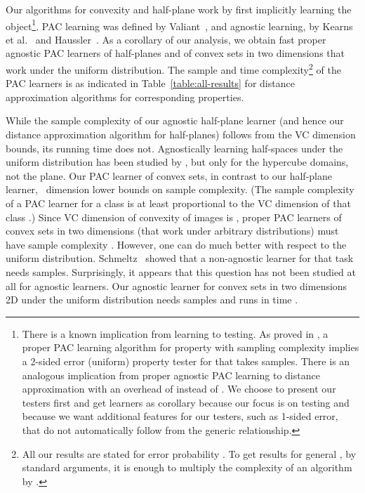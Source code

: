 \documentclass[11pt,english]{article}
\numberwithin{figure}{section}
\begin{document}
Our algorithms for convexity and half-plane work by first implicitly learning the object\footnote{\label{fn:connection-to-learning}There is a known implication from learning to testing. As proved in \cite{GGR98}, a proper PAC learning algorithm for property 
with sampling complexity  implies a 2-sided error (uniform) property tester for  that takes  samples. There is an analogous implication from proper agnostic PAC learning to distance approximation with an overhead of  instead of . We choose to present our testers first and get learners as corollary because our focus is on testing and because we want additional features for our testers, such as 1-sided error, that do not automatically follow from the generic relationship.}.
\ifnum{}
PAC learning was defined by Valiant~\cite{Valiant84}, and agnostic learning, by Kearns et al.~\cite{KearnsSS94} and Haussler~\cite{Haussler92}.
\fi
 As a corollary of our analysis, we obtain fast proper agnostic PAC learners of half-planes and of convex sets in two dimensions that work under the uniform distribution.
The sample and time complexity\footnote{All our results are stated for error probability . To get results for general , by standard arguments, it is enough to multiply the complexity of an algorithm by .} of the PAC learners is as indicated in Table~\ref{table:all-results} for distance approximation algorithms for corresponding properties.



While the sample complexity of our agnostic half-plane learner (and hence our distance approximation algorithm for half-planes) follows from the VC dimension bounds, its running time does not. Agnostically learning half-spaces under the uniform distribution has been studied by \cite{KalaiKMS08}, but only for the hypercube  domains, not the plane.
Our PAC learner of convex sets, in contrast to our half-plane learner, \ dimension lower bounds on sample complexity. (The sample complexity of a PAC learner for a class
is at least proportional to the VC dimension of that class \cite{EHKV89}.) Since VC dimension of convexity of  images is
,
proper PAC learners of convex sets in two dimensions (that work under arbitrary distributions) must have sample complexity . However, one can do much better with respect to the uniform distribution.
Schmeltz~\cite{Sch92} showed that a non-agnostic learner for that task needs
 samples.
Surprisingly, it appears that this question has not been studied at all for agnostic learners. Our agnostic learner for convex sets in
\ifnum{}
two dimensions
\else
2D
\fi
under the uniform distribution needs
 samples and runs in time .
\end{document}

